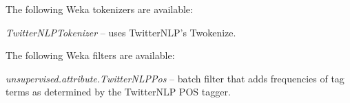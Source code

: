 \documentclass[a4paper]{book}
\begin{document}
The following Weka tokenizers are available:
\begin{tight_itemize}
	\item \textit{TwitterNLPTokenizer} -- uses TwitterNLP's Twokenize.
\end{tight_itemize}
The following Weka filters are available:
\begin{tight_itemize}
	\item \textit{unsupervised.attribute.TwitterNLPPos} -- batch filter
	that adds frequencies of tag terms as determined by the TwitterNLP
	POS tagger.
\end{tight_itemize}


\end{document}
